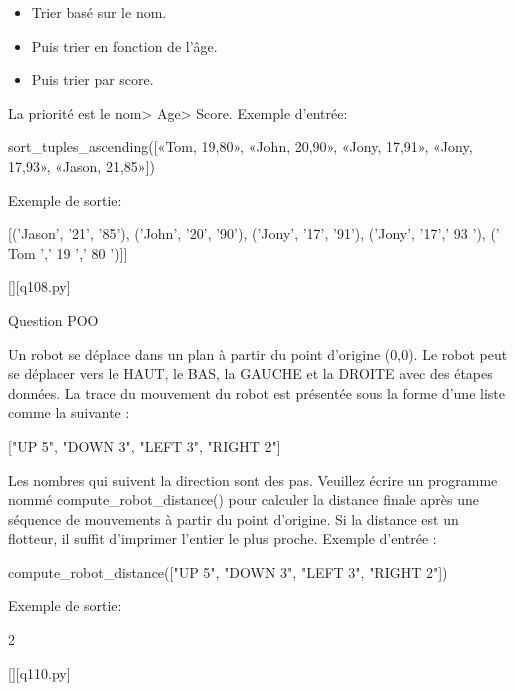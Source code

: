 		\begin{itemize}
		\item Trier basé sur le nom.
		\item Puis trier en fonction de l'âge.
		\item Puis trier par score.
		\end{itemize}
		
		La priorité est le nom> Age> Score.\newline
		Exemple d'entrée:
		
		sort\_tuples\_ascending([«Tom, 19,80», «John, 20,90», «Jony, 17,91», «Jony, 17,93», «Jason, 21,85»])
		
		Exemple de sortie:
		
		[('Jason', '21', '85'), ('John', '20', '90'), ('Jony', '17', '91'), ('Jony', '17',' 93 '), (' Tom ',' 19 ',' 80 ')]]
		\par
		\renewcommand{\nomfichier}{q108.py}
		\begin{solution}
		    \pythonfile{\chemincode \nomfichier}[][\nomfichier]
		\end{solution}
        
		\question
		Question POO
        
		\question
		Un robot se déplace dans un plan à partir du point d'origine (0,0). Le robot peut se déplacer vers le HAUT, le BAS, la GAUCHE et la DROITE avec des étapes données. La trace du mouvement du robot est présentée sous la forme d'une liste comme la suivante :
		
		["UP 5", "DOWN 3", "LEFT 3", "RIGHT 2"]
		
		Les nombres qui suivent la direction sont des pas. Veuillez écrire un programme nommé compute\_robot\_distance() pour calculer la distance finale après une séquence de mouvements à partir du point d'origine. Si la distance est un flotteur, il suffit d'imprimer l'entier le plus proche.
		Exemple d'entrée :
		
		compute\_robot\_distance(["UP 5", "DOWN 3", "LEFT 3", "RIGHT 2"])
		
		Exemple de sortie:
		
		2
		\par
		\renewcommand{\nomfichier}{q110.py}
		\begin{solution}
		    \pythonfile{\chemincode \nomfichier}[][\nomfichier]
		\end{solution}
        
